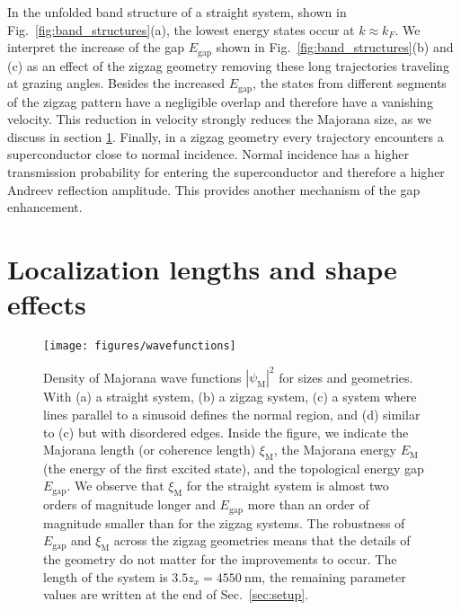 \documentclass[english, twocolumn, 10pt, aps, superscriptaddress, floatfix, prb, citeautoscript]{revtex4-1}
\renewcommand{\comment}[2]{#2}
\begin{document}
\comment{Zigzag improves the gap and size because of cutting of trajectories and increasing transparency.}
In the unfolded band structure of a straight system, shown in Fig.~\ref{fig:band_structures}(a), the lowest energy states occur at $k \approx k_F$.
We interpret the increase of the gap $E_\textrm{gap}$ shown in Fig.~\ref{fig:band_structures}(b) and (c) as an effect of the zigzag geometry removing these long trajectories traveling at grazing angles.
Besides the increased $E_\textrm{gap}$, the states from different segments of the zigzag pattern have a negligible overlap and therefore have a vanishing velocity.
This reduction in velocity strongly reduces the Majorana size, as we discuss in section \ref{sec:shape_effects}.
Finally, in a zigzag geometry every trajectory encounters a superconductor close to normal incidence.
Normal incidence has a higher transmission probability for entering the superconductor and therefore a higher Andreev reflection amplitude.
This provides another mechanism of the gap enhancement.

\section{Localization lengths and shape effects}\label{sec:shape_effects}

\begin{figure}[!htb]
\texttt{[image: figures/wavefunctions]}
\caption{Density of Majorana wave functions $\left| \psi_\textrm{M} \right|^2$ for sizes and geometries.
With (a) a straight system, (b) a zigzag system, (c) a system where lines parallel to a sinusoid defines the normal region, and (d) similar to (c) but with disordered edges.
Inside the figure, we indicate the Majorana length (or coherence length) $\xi_\textrm{M}$, the Majorana energy $E_\textrm{M}$ (the energy of the first excited state), and the topological energy gap $E_\textrm{gap}$.
We observe that $\xi_\textrm{M}$ for the straight system is almost two orders of magnitude longer and $E_\textrm{gap}$ more than an order of magnitude smaller than for the zigzag systems.
The robustness of $E_\textrm{gap}$ and $\xi_\textrm{M}$ across the zigzag geometries means that the details of the geometry do not matter for the improvements to occur.
The length of the system is $3.5 z_x=\SI{4550}{\nm}$, the remaining parameter values are written at the end of Sec.~\ref{sec:setup}.\label{fig:wave_functions}}
\end{figure}
\end{document}
